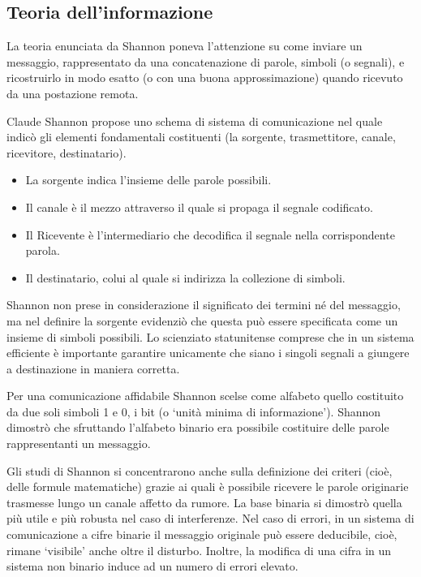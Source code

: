 \documentclass[12pt]{article} %
\begin{document}
\subsection{Teoria dell'informazione}
La teoria enunciata da Shannon poneva l’attenzione su come inviare un messaggio, rappresentato da una concatenazione di parole, simboli (o segnali), e ricostruirlo in modo esatto (o con una buona approssimazione) quando ricevuto da una postazione remota.\par\medskip\noindent
Claude Shannon propose uno schema di sistema di comunicazione nel quale indicò gli elementi fondamentali costituenti (la sorgente, trasmettitore, canale, ricevitore, destinatario).
\begin{itemize}
    \item La sorgente indica l’insieme delle parole possibili.
    \item Il canale è il mezzo attraverso il quale si propaga il segnale codificato.
    \item Il Ricevente è l’intermediario che decodifica il segnale nella corrispondente parola.
    \item Il destinatario, colui al quale si indirizza la collezione di simboli. \par\medskip\noindent
\end{itemize}
Shannon non prese in considerazione il significato dei termini né del messaggio, ma nel definire la sorgente evidenziò che questa può essere specificata come un insieme di simboli possibili. Lo scienziato statunitense comprese che in un sistema efficiente è importante garantire unicamente che siano i singoli segnali a giungere a destinazione in maniera corretta.\par\medskip\noindent
Per una comunicazione affidabile Shannon scelse come alfabeto quello costituito da due soli simboli 1 e 0, i bit (o ‘unità minima di informazione’). Shannon dimostrò che sfruttando l’alfabeto binario era possibile costituire delle parole rappresentanti un messaggio.\par\medskip\noindent
Gli studi di Shannon si concentrarono anche sulla definizione dei criteri (cioè, delle formule matematiche) grazie ai quali è possibile ricevere le parole originarie trasmesse lungo un canale affetto da rumore. La base binaria si dimostrò quella più utile e più robusta nel caso di interferenze. Nel caso di errori, in un sistema di comunicazione a cifre binarie il messaggio originale può essere deducibile, cioè, rimane ‘visibile’ anche oltre il disturbo. Inoltre, la modifica di una cifra in un sistema non binario induce ad un numero di errori elevato.\par\medskip\noindent
\end{document}
